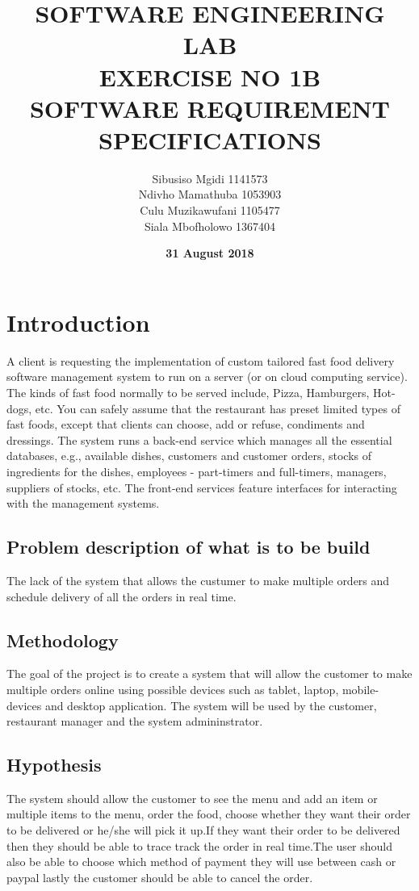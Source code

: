 \documentclass[11pt]{article}
\title{\textbf{SOFTWARE ENGINEERING LAB \\EXERCISE NO 1B\\ SOFTWARE REQUIREMENT SPECIFICATIONS}}
\author{\Large Sibusiso Mgidi 1141573\\
		\Large Ndivho Mamathuba 1053903\\
		\Large Culu Muzikawufani 1105477\\	
		\Large Siala Mbofholowo 1367404\\
		}
\date{\textbf{\Large 31 August 2018}}
\begin{document}
\linespread{1.5}
\tableofcontents
\newpage
\section{\Large Introduction}
\Large A client is requesting the implementation of custom tailored fast food delivery software management
system to run on a server (or on cloud computing service). The kinds of fast food
normally to be served include, Pizza, Hamburgers, Hot-dogs, etc. You can safely assume that
the restaurant has preset limited types of fast foods, except that clients can choose, add or refuse, condiments and dressings.
The system runs a back-end service which manages all the essential databases, e.g., available
dishes, customers and customer orders, stocks of ingredients for the dishes, employees -
part-timers and full-timers, managers, suppliers of stocks, etc. The front-end services feature
interfaces for interacting with the management systems.

\subsection{\Large Problem description of what is to be build}
The lack of the system that allows the custumer to make multiple orders and schedule delivery of all the orders in real time.
\subsection{\Large Methodology}
The goal of the project is to create a system that will allow the customer to make multiple orders online using possible devices such as tablet, laptop, mobile-devices and desktop application. The system will be used by the customer, restaurant manager and the system admininstrator.
\subsection{\Large Hypothesis}
The system should allow the customer to see the menu and add an item or multiple items to the menu, order the food, choose whether they want their order to be delivered or he/she will pick it up.If they want their order to be delivered then they should be able to trace track the order in real time.The user should also be able to choose which method of payment they will use between cash or paypal lastly the customer should be able to cancel the order.
\end{document}
